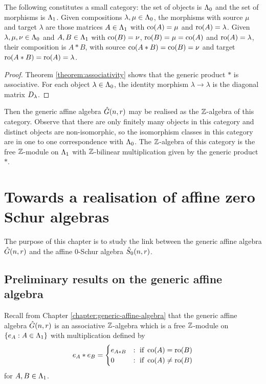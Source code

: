 \documentclass[a4paper, 11pt, twoside]{report}
\begin{document}
\begin{proposition}\label{prop:generic-category}
The following constitutes a small category: the set of objects is $\Lambda_0{}$ and the set of morphisms is $\Lambda_1{}$. Given compositions $\lambda,\mu\in\Lambda_0{}$, the morphisms with source $\mu$ and target $\lambda$ are those matrices $A\in\Lambda_1{}$ with $\operatorname{co}(A)=\mu$ and $\operatorname{ro}(A)=\lambda$. Given $\lambda,\mu,\nu\in\Lambda_0{}$ and $A,B\in\Lambda_1{}$ with $\operatorname{co}(B)=\nu$, $\operatorname{ro}(B)=\mu=\operatorname{co}(A)$ and $\operatorname{ro}(A)=\lambda$, their composition is $A\ast B$, with source $\operatorname{co}(A\ast B)=\operatorname{co}(B)=\nu$ and target $\operatorname{ro}(A\ast B)=\operatorname{ro}(A)=\lambda$.
\end{proposition}

\begin{proof}
Theorem \ref{theorem:associativity} shows that the generic product $\ast$ is associative. For each object $\lambda\in\Lambda_0{}$, the identity morphism $\lambda\to\lambda$ is the diagonal matrix $D_{\lambda}$.
\end{proof}

Then the generic affine algebra $\hat{G}(n,r)$ may be realised as the $\mathbb{Z}$-algebra of this category. Observe that there are only finitely many objects in this category and distinct objects are non-isomorphic, so the isomorphism classes in this category are in one to one correspondence with $\Lambda_0{}$. The $\mathbb{Z}$-algebra of this category is the free $\mathbb{Z}$-module on $\Lambda_1{}$ with $\mathbb{Z}$-bilinear multiplication given by the generic product $\ast$.



\chapter{Towards a realisation of affine zero Schur algebras}\label{chapter:affine-0-schur}

The purpose of this chapter is to study the link between the generic affine algebra $\hat{G}(n,r)$ and the affine $0$-Schur algebra $\hat{S}_0(n,r)$.

\section{Preliminary results on the generic affine algebra}

Recall from Chapter \ref{chapter:generic-affine-algebra} that the generic affine algebra $\hat{G}(n,r)$ is an associative $\mathbb{Z}$-algebra which is a free $\mathbb{Z}$-module on $\{e_A:A\in\Lambda_1{}\}$ with multiplication defined by
\begin{equation*}
e_A\ast e_B = \begin{cases}
e_{A\ast B} &: \text{ if }\operatorname{co}(A)=\operatorname{ro}(B)\\
0 &: \text{ if }\operatorname{co}(A)\neq\operatorname{ro}(B)
\end{cases}
\end{equation*}
for $A,B\in\Lambda_1{}$.
\end{document}
